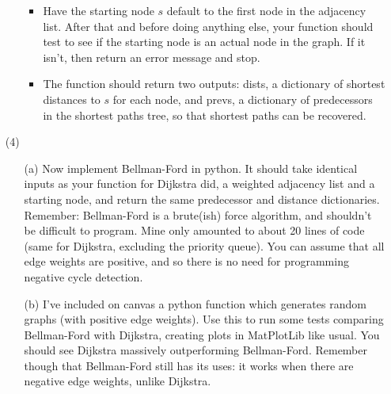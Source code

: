 \documentclass[12pt]{article}
\begin{document}
\begin{enumerate}
\begin{itemize}
\begin{itemize}
            \item Have the starting node $s$ default to the first node in the adjacency list. After that and before doing anything else, your function should test to see if the starting node is an actual node in the graph. If it isn't, then return an error message and stop.
            \item The function should return two outputs: dists, a dictionary of shortest distances to $s$ for each node, and prevs, a dictionary of predecessors in the shortest paths tree, so that shortest paths can be recovered. 
        \end{itemize} 
    \end{itemize}
    \item[(4)] 
    \begin{itemize}
        \item[(a)] Now implement Bellman-Ford in python. It should take identical inputs as your function for Dijkstra did, a weighted adjacency list and a starting node, and return the same predecessor and distance dictionaries. Remember: Bellman-Ford is a brute(ish) force algorithm, and shouldn't be difficult to program. Mine only amounted to about 20 lines of code (same for Dijkstra, excluding the priority queue). You can assume that all edge weights are positive, and so there is no need for programming negative cycle detection. 
        \item[(b)] I've included on canvas a python function which generates random graphs (with positive edge weights). Use this to run some tests comparing Bellman-Ford with Dijkstra, creating plots in MatPlotLib like usual. You should see Dijkstra massively outperforming Bellman-Ford. Remember though that Bellman-Ford still has its uses: it works when there are negative edge weights, unlike Dijkstra. 
    \end{itemize}
    
\end{enumerate}
\end{document}
